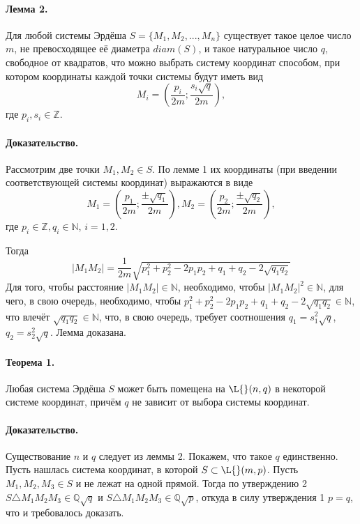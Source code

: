 \documentclass[a4paper,14pt]{article} %
\begin{document}
\paragraph{Лемма 2.}

Для любой системы Эрдёша $S=\{M_1, M_2, ..., M_n\}$ существует такое целое число $m$, не превосходящее её диаметра $diam(S)$,
и такое натуральное число $q$, свободное от квадратов,
что можно выбрать систему координат способом, при котором координаты каждой точки системы будут иметь вид
\begin{equation}\label{grid_for_Erdosh_system}
	M_i = \left(
		\frac{p_i}{2m}
		;
		\frac{s_i\sqrt{q}}{2m}
	\right),
\end{equation}
где $p_i, s_i \in \mathbb{Z}$.

\paragraph{Доказательство.}
Рассмотрим две точки $M_1, M_2 \in S$.
По лемме 1 их координаты (при введении соответствующей системы координат) выражаются в виде
\begin{equation}
	M_1 = \left(
		\frac{p_1}{2m}
		;
		\frac{\pm\sqrt{q_1}}{2m}
	\right),
	M_2 = \left(
		\frac{p_2}{2m}
		;
		\frac{\pm\sqrt{q_2}}{2m}
	\right),
\end{equation}
где $p_i \in \mathbb{Z}, q_i \in \mathbb{N}$, $i=1,2$.

Тогда
\begin{equation}
	|M_1 M_2| = \frac{1}{2m} \sqrt{p_1^2 + p_2^2 - 2p_1p_2 + q_1 + q_2 - 2\sqrt{q_1 q_2}}
\end{equation}
Для того, чтобы расстояние $|M_1 M_2| \in \mathbb{N}$, необходимо,
чтобы $|M_1 M_2|^2 \in \mathbb{N}$, для чего, в свою очередь, необходимо, чтобы
$p_1^2 + p_2^2 - 2p_1p_2 + q_1 + q_2 - 2\sqrt{q_1 q_2} \in \mathbb{N}$,
что влечёт $\sqrt{q_1 q_2} \in \mathbb{N}$,
что, в свою очередь, требует соотношения
$q_1 = s_1^2 \sqrt{q}$, $q_2 = s_2^2 \sqrt{q}$.
Лемма доказана.

\paragraph{Теорема 1.}
Любая система Эрдёша $S$ может быть помещена на $\L{}(n,q)$ в некоторой системе координат,
причём $q$ не зависит от выбора системы координат.

\paragraph{Доказательство.}
Существование $n$ и $q$ следует из леммы 2.
Покажем, что такое $q$ единственно.
Пусть нашлась система координат, в которой $S \subset \L{}(m,p)$.
Пусть $M_1, M_2, M_3 \in S$ и не лежат на одной прямой.
Тогда по утверждению 2 $S\triangle M_1 M_2 M_3 \in \mathbb{Q}\sqrt{q}$
и $S\triangle M_1 M_2 M_3 \in \mathbb{Q}\sqrt{p}$,
откуда в силу утверждения 1 $p=q$,
что и требовалось доказать.
\end{document}
